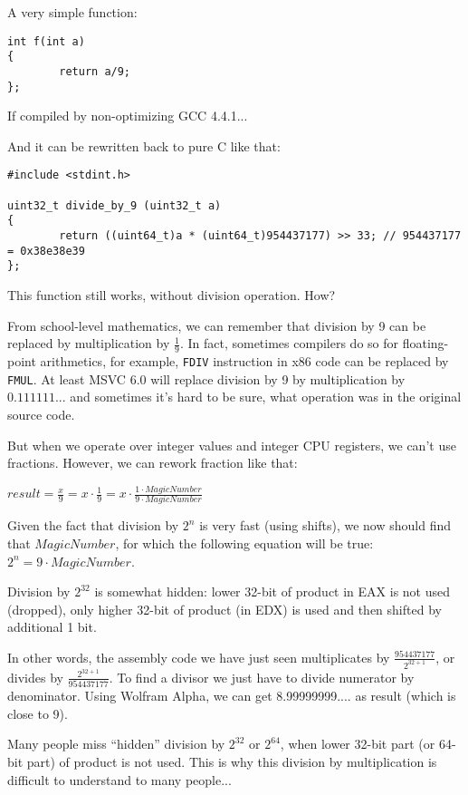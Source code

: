 
A very simple function:

\begin{lstlisting}
int f(int a)
{
        return a/9;
};
\end{lstlisting}

If compiled by non-optimizing GCC 4.4.1...



And it can be rewritten back to pure C like that:

\begin{lstlisting}[style=customc]
#include <stdint.h>

uint32_t divide_by_9 (uint32_t a)
{
        return ((uint64_t)a * (uint64_t)954437177) >> 33; // 954437177 = 0x38e38e39
};
\end{lstlisting}

This function still works, without division operation. How?

From school-level mathematics, we can remember that division by 9 can be replaced by multiplication by $\frac{1}{9}$.
In fact, sometimes compilers do so for floating-point arithmetics, for example, \texttt{FDIV} instruction in x86 code
can be replaced by \texttt{FMUL}.
At least MSVC 6.0 will replace division by 9 by multiplication by $0.111111...$ and sometimes it's hard to be sure,
what operation was in the original source code.

But when we operate over integer values and integer CPU registers, we can't use fractions.
However, we can rework fraction like that:

\begin{center}
$result = \frac{x}{9} = x \cdot \frac{1}{9} = x \cdot \frac{1 \cdot MagicNumber}{9 \cdot MagicNumber}$
\end{center}

Given the fact that division by $2^n$ is very fast (using shifts), we now should find that $MagicNumber$,
for which the following
equation will be true: $2^n = 9 \cdot MagicNumber$.

Division by $2^{32}$ is somewhat hidden: lower 32-bit of product in EAX is not used (dropped), only higher 32-bit of
product (in EDX) is used and then shifted by additional 1 bit.

In other words, the assembly code we have just seen multiplicates by {\Large $\frac{954437177}{2^{32+1}}$},
or divides by {\Large $\frac{2^{32+1}}{954437177}$}.
To find a divisor we just have to divide numerator by denominator.
Using Wolfram Alpha, we can get 8.99999999.... as result (which is close to 9).



Many people miss ``hidden'' division by $2^{32}$ or $2^{64}$,
when lower 32-bit part (or 64-bit part) of product is not used.
This is why this division by multiplication is difficult to understand to many people...


